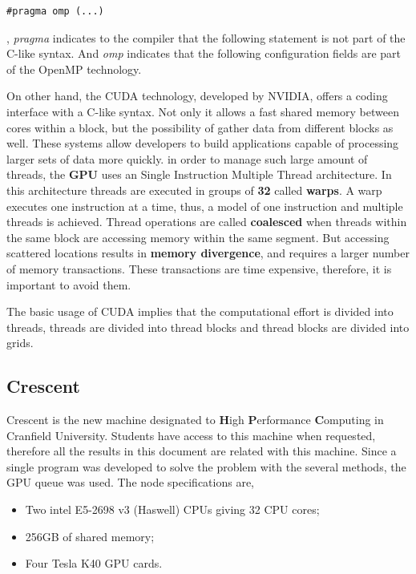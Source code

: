 \documentclass[12pt]{article}
\begin{document}
\begin{lstlisting}[style=pragma]
#pragma omp (...)
\end{lstlisting}
, \textit{pragma} indicates to the compiler that the following statement is not part of the C-like syntax. And \textit{omp} indicates that the following configuration fields are part of the OpenMP technology.
\par On other hand, the CUDA technology, developed by NVIDIA, offers a coding interface with a C-like syntax. Not only it allows a fast shared memory between cores within a block, but the possibility of gather data from different blocks as well. These systems allow developers to build applications capable of processing larger sets of data more quickly.\cite{cpu-gpu} in order to manage such large amount of threads, the \textbf{GPU} uses an Single Instruction Multiple Thread architecture. In this architecture threads are executed in groups of \textbf{32} called \textbf{warps}. A warp executes one instruction at a time, thus, a model of one instruction and multiple threads is achieved. Thread operations are called \textbf{coalesced} when threads within the same block are accessing memory within the same segment. But accessing scattered locations results in \textbf{memory divergence}, and requires a larger number of memory transactions. These transactions are time expensive, therefore, it is important to avoid them. 
\par The basic usage of CUDA implies that the computational effort is divided into threads, threads are divided into thread blocks and thread blocks are divided into grids.\cite{scalar-vm} 

\subsection*{Crescent}

\par Crescent is the new machine designated to \textbf{H}igh \textbf{P}erformance \textbf{C}omputing in Cranfield University. Students have access to this machine when requested, therefore all the results in this document are related with this machine. Since a single program was developed to solve the problem with the several methods, the GPU queue was used. The node specifications are,

\begin{itemize}
  \item Two intel E5-2698 v3 (Haswell) CPUs giving 32 CPU cores;
  \item 256GB of shared memory;
  \item Four Tesla K40 GPU cards.
\end{itemize}
\end{document}
